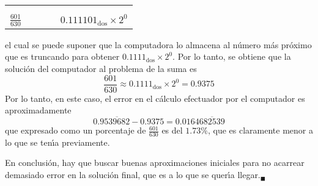 \begin{solucion}
\begin{enumerate}
\begin{center}
\begin{tabular}{ccccc}
    \vspace{-0.4cm}
    \\
    \hhline{-~~~-}
    \vspace{-0.4cm}
    \\
    $\frac{601}{630}$ & & & & $0.111101_{\text{dos}} \times 2^{0}$
   \end{tabular}
  \end{center}
  el cual se puede suponer que la computadora lo almacena al n\'umero m\'as pr\'oximo que es truncando para obtener $0.1111_{\text{dos}} \times 2^{0}$. Por lo tanto, se obtiene que la soluci\'on del computador al problema de la suma es
  \begin{equation*}
   \frac{601}{630} \approx 0.1111_{\text{dos}} \times 2^{0} = 0.9375
  \end{equation*}
  Por lo tanto, en este caso, el error en el c\'alculo efectuador por el computador es aproximadamente
  \begin{equation*}
   0.9\overline{539682} - 0.9375 = 0.0164\overline{682539}
  \end{equation*}
  que expresado como un porcentaje de $\frac{601}{630}$ es del $1.73\%$, que es claramente menor a lo que se ten\'{\i}a previamente.
  \par 
  En conclusi\'on, hay que buscar buenas aproximaciones iniciales para no acarrear demasiado error en la soluci\'on final, que es a lo que se quer\'{\i}a llegar.${}_{\blacksquare}$

 \end{enumerate}
\end{solucion}
